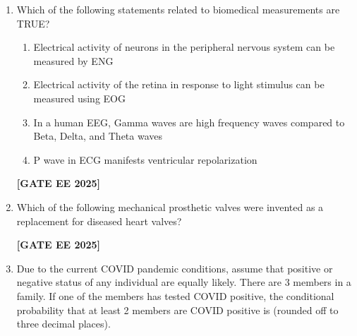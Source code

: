 \documentclass[journal]{IEEEtran}
\newcommand{\qfooter}{%
  \begin{flushright}\footnotesize\textbf{[GATE EE 2025]}\end{flushright}\vspace{1em}%
}
\begin{document}
\begin{enumerate}
\begin{enumerate}
\item Pulse oximeter can non-invasively determine arterial oxygen saturation (SpO2) by analyzing the light transmitted through the skin during the systolic phase of the blood flow through the tissue
\item In a pulse oximeter, isosbestic wavelength is the wavelength at which Hb and HbO2 have same optical absorbance
\item Pulse oximeter can accurately determine the SpO2 of blood by computing the ratio of absorbances at 660 nm and 905 nm wavelengths
\item Pulse oximeter can accurately determine the SpO2 of blood by computing the ratio of absorbances at 850 nm and 950 nm wavelengths
\end{enumerate}
\qfooter

\item Which of the following statements related to biomedical measurements are TRUE?

\begin{enumerate}
\item Electrical activity of neurons in the peripheral nervous system can be measured by ENG
\item Electrical activity of the retina in response to light stimulus can be measured using EOG
\item In a human EEG, Gamma waves are high frequency waves compared to Beta, Delta, and Theta waves
\item P wave in ECG manifests ventricular repolarization
\end{enumerate}
\qfooter

\item Which of the following mechanical prosthetic valves were invented as a replacement for diseased heart valves?

\begin{enumerate}
\end{enumerate}
\qfooter

\item Due to the current COVID pandemic conditions, assume that positive or negative status of any individual are equally likely. There are 3 members in a family. If one of the members has tested COVID positive, the conditional probability that at least 2 members are COVID positive is \underline{\hspace{2cm}}(rounded off to three decimal places).


\end{enumerate}
\end{document}
